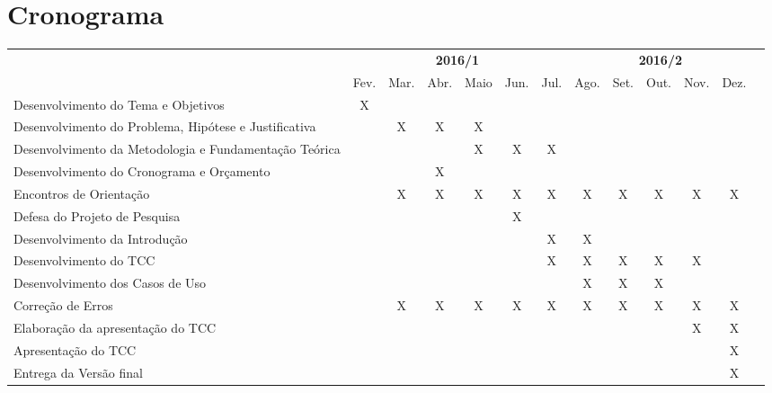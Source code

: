 \section{Cronograma}\label{lcronograma}

\begin{adjustbox}{center}
  \tiny
  \begin{tabular}{|p{4cm}|c|c|c|c|c|c|c|c|c|c|c|l|}
    \cline{1-12}
      \multicolumn{1}{|c|}{
        \multirow{2}{*}{
          \diagbox[width=4.4cm]{
            \textbf{Atividades}
          }{
            \textbf{Ano/Mês}
          }}}
      & \multicolumn{6}{c|}{\textbf{2016/1}}
      & \multicolumn{5}{c|}{\textbf{2016/2}} \\
      \cline{2-12}
      & Fev. & Mar. & Abr. & Maio & Jun. & Jul. & Ago. & Set. & Out. & Nov. & Dez. \\
    \hline
      Desenvolvimento do Tema e Objetivos
      & X &  &  &  &  &  &  &  &  &  &  \\
    \hline
      Desenvolvimento do Problema, Hipótese e Justificativa
      & & X & X & X &  &  &  &  &  &  &  \\
    \hline
      Desenvolvimento da Metodologia e Fundamentação Teórica
      & & & & X & X & X & & & & & \\
    \hline
      Desenvolvimento do Cronograma e Orçamento
      & & & X & & & & & & & & \\
    \hline
      Encontros de Orientação
      & & X & X & X & X & X & X & X & X & X & X \\
    \hline
      Defesa do Projeto de Pesquisa
      & & & & & X & & & & & & \\
    \hline
      Desenvolvimento da Introdução
      & & & & & & X & X & & & & \\
    \hline
      Desenvolvimento do TCC
      & & & & & & X & X & X & X & X & \\
    \hline
      Desenvolvimento dos Casos de Uso
      & & & & & & & X & X & X & & \\
    \hline
      Correção de Erros
      & & X & X & X & X & X & X & X & X & X & X \\
    \hline
      Elaboração da apresentação do TCC
      & & & & & & & & & & X & X \\
    \hline
      Apresentação do TCC
      & & & & & & & & & & & X \\
    \hline
      Entrega da Versão final
      & & & & & & & & & & & X \\
    \hline
  \end{tabular}
\end{adjustbox}
